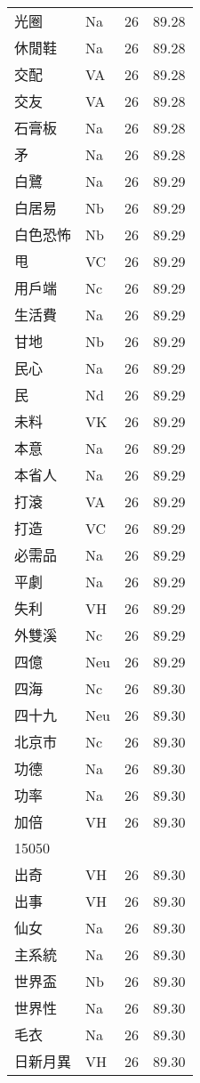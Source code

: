 \documentclass[twocolumn]{book}
\begin{document}
\begin{supertabular}{llrr}
光圈 & Na & 26 &  89.28\\
休閒鞋 & Na & 26 &  89.28\\
交配 & VA & 26 &  89.28\\
交友 & VA & 26 &  89.28\\
石膏板 & Na & 26 &  89.28\\
矛 & Na & 26 &  89.28\\
白鷺 & Na & 26 &  89.29\\
白居易 & Nb & 26 &  89.29\\
白色恐怖 & Nb & 26 &  89.29\\
甩 & VC & 26 &  89.29\\
用戶端 & Nc & 26 &  89.29\\
生活費 & Na & 26 &  89.29\\
甘地 & Nb & 26 &  89.29\\
民心 & Na & 26 &  89.29\\
民 & Nd & 26 &  89.29\\
未料 & VK & 26 &  89.29\\
本意 & Na & 26 &  89.29\\
本省人 & Na & 26 &  89.29\\
打滾 & VA & 26 &  89.29\\
打造 & VC & 26 &  89.29\\
必需品 & Na & 26 &  89.29\\
平劇 & Na & 26 &  89.29\\
失利 & VH & 26 &  89.29\\
外雙溪 & Nc & 26 &  89.29\\
四億 & Neu & 26 &  89.29\\
四海 & Nc & 26 &  89.30\\
四十九 & Neu & 26 &  89.30\\
北京市 & Nc & 26 &  89.30\\
功德 & Na & 26 &  89.30\\
功率 & Na & 26 &  89.30\\
加倍 & VH & 26 &  89.30\\
15050\\
出奇 & VH & 26 &  89.30\\
出事 & VH & 26 &  89.30\\
仙女 & Na & 26 &  89.30\\
主系統 & Na & 26 &  89.30\\
世界盃 & Nb & 26 &  89.30\\
世界性 & Na & 26 &  89.30\\
毛衣 & Na & 26 &  89.30\\
日新月異 & VH & 26 &  89.30\\

\end{supertabular}
\end{document}
